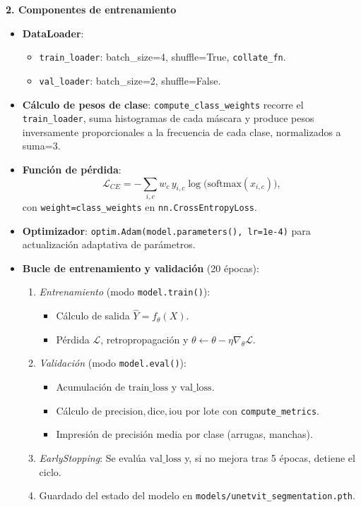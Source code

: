 \textbf{2. Componentes de entrenamiento}
\begin{itemize}
  \item \textbf{DataLoader}:  
    \begin{itemize}
      \item \texttt{train\_loader}: batch\_size=4, shuffle=True, \texttt{collate\_fn}.
      \item \texttt{val\_loader}: batch\_size=2, shuffle=False.
    \end{itemize}

  \item \textbf{Cálculo de pesos de clase}:  
    \texttt{compute\_class\_weights} recorre el \texttt{train\_loader}, suma histogramas de cada máscara y produce pesos inversamente proporcionales a la frecuencia de cada clase, normalizados a suma=3.

  \item \textbf{Función de pérdida}:  
    \[
      \mathcal{L}_{CE} = -\sum_{i,c} w_c \, y_{i,c} \log\bigl(\mathrm{softmax}(x_{i,c})\bigr),
    \]
    con \texttt{weight=class\_weights} en \texttt{nn.CrossEntropyLoss}.

  \item \textbf{Optimizador}:  
    \texttt{optim.Adam(model.parameters(), lr=1e-4)} para actualización adaptativa de parámetros.

  \item \textbf{Bucle de entrenamiento y validación} (20 épocas):
    \begin{enumerate}
      \item \textit{Entrenamiento} (modo \texttt{model.train()}):  
        \begin{itemize}
          \item Cálculo de salida \(\hat{Y}=f_\theta(X)\).
          \item Pérdida \(\mathcal{L}\), retropropagación y \(\theta\leftarrow\theta-\eta\nabla_\theta\mathcal{L}\).
        \end{itemize}
      \item \textit{Validación} (modo \texttt{model.eval()}):  
        \begin{itemize}
          \item Acumulación de \(\mathrm{train\_loss}\) y \(\mathrm{val\_loss}\).
          \item Cálculo de \(\mathrm{precision}, \mathrm{dice}, \mathrm{iou}\) por lote con \texttt{compute\_metrics}.
          \item Impresión de precisión media por clase (arrugas, manchas).
        \end{itemize}
      \item \textit{EarlyStopping}: Se evalúa \(\mathrm{val\_loss}\) y, si no mejora tras 5 épocas, detiene el ciclo.
      \item Guardado del estado del modelo en \texttt{models/unetvit\_segmentation.pth}.
    \end{enumerate}


\end{itemize}
